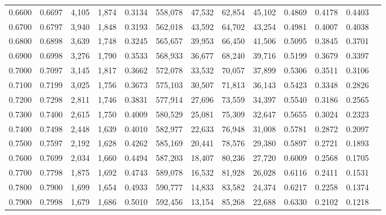 \begin{tabular}{rrrrrrrrrrrrr}
0.6600 & 0.6697 &  4,105 & 1,874 &                                     0.3134 & 558,078 &  47,532 &  62,854 &  45,102 & 0.4869 & 0.4178 & 0.4403 \\
0.6700 & 0.6797 &  3,940 & 1,848 &                                     0.3193 & 562,018 &  43,592 &  64,702 &  43,254 & 0.4981 & 0.4007 & 0.4038 \\
0.6800 & 0.6898 &  3,639 & 1,748 &                                     0.3245 & 565,657 &  39,953 &  66,450 &  41,506 & 0.5095 & 0.3845 & 0.3701 \\
0.6900 & 0.6998 &  3,276 & 1,790 &                                     0.3533 & 568,933 &  36,677 &  68,240 &  39,716 & 0.5199 & 0.3679 & 0.3397 \\
0.7000 & 0.7097 &  3,145 & 1,817 &                                     0.3662 & 572,078 &  33,532 &  70,057 &  37,899 & 0.5306 & 0.3511 & 0.3106 \\
0.7100 & 0.7199 &  3,025 & 1,756 &                                     0.3673 & 575,103 &  30,507 &  71,813 &  36,143 & 0.5423 & 0.3348 & 0.2826 \\
0.7200 & 0.7298 &  2,811 & 1,746 &                                     0.3831 & 577,914 &  27,696 &  73,559 &  34,397 & 0.5540 & 0.3186 & 0.2565 \\
0.7300 & 0.7400 &  2,615 & 1,750 &                                     0.4009 & 580,529 &  25,081 &  75,309 &  32,647 & 0.5655 & 0.3024 & 0.2323 \\
0.7400 & 0.7498 &  2,448 & 1,639 &                                     0.4010 & 582,977 &  22,633 &  76,948 &  31,008 & 0.5781 & 0.2872 & 0.2097 \\
0.7500 & 0.7597 &  2,192 & 1,628 &                                     0.4262 & 585,169 &  20,441 &  78,576 &  29,380 & 0.5897 & 0.2721 & 0.1893 \\
0.7600 & 0.7699 &  2,034 & 1,660 &                                     0.4494 & 587,203 &  18,407 &  80,236 &  27,720 & 0.6009 & 0.2568 & 0.1705 \\
0.7700 & 0.7798 &  1,875 & 1,692 &                                     0.4743 & 589,078 &  16,532 &  81,928 &  26,028 & 0.6116 & 0.2411 & 0.1531 \\
0.7800 & 0.7900 &  1,699 & 1,654 &                                     0.4933 & 590,777 &  14,833 &  83,582 &  24,374 & 0.6217 & 0.2258 & 0.1374 \\
0.7900 & 0.7998 &  1,679 & 1,686 &                                     0.5010 & 592,456 &  13,154 &  85,268 &  22,688 & 0.6330 & 0.2102 & 0.1218 \\

\end{tabular}
